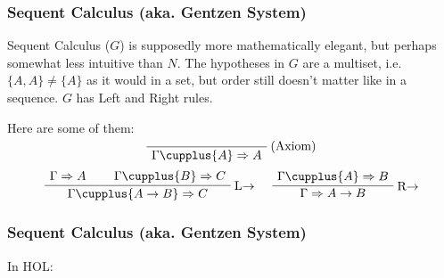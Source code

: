 \documentclass[english,svgnames,hide notes,12pt]{beamer}
\theoremstyle{definition}
\theoremstyle{remark}
\begin{document}
\begin{frame}
    \frametitle{Sequent Calculus (aka. Gentzen System)}
    Sequent Calculus ($G$) is supposedly more mathematically elegant, but perhaps somewhat less intuitive than $N$. The hypotheses in $G$ are a multiset, i.e. $\{A,A\}\neq\{A\}$ as it would in a set, but order still doesn't matter like in a sequence. $G$ has Left and Right rules.

    Here are some of them:
    \[
        \AxiomC{}
        \RightLabel{(Axiom)}
        \UnaryInfC{$\Gamma \cupplus \{A\}\Rightarrow A$}
        \DisplayProof
    \]
    \[
        \AxiomC{$\Gamma\Rightarrow A$}
        \AxiomC{$\Gamma\cupplus\{B\}\Rightarrow C$}
        \RightLabel{L$\to$}
        \BinaryInfC{$\Gamma\cupplus\{A\to B\}\Rightarrow C$}
        \DisplayProof
        \hspace{0.5cm}
        \AxiomC{$\Gamma\cupplus\{A\}\Rightarrow B$}
        \RightLabel{R$\to$}
        \UnaryInfC{$\Gamma\Rightarrow A\to B$}
        \DisplayProof
    \]
\end{frame}

\begin{frame}
    \frametitle{Sequent Calculus (aka. Gentzen System)}
    In HOL:
    \begin{alltt}
    \end{alltt}
\end{frame}
\end{document}
